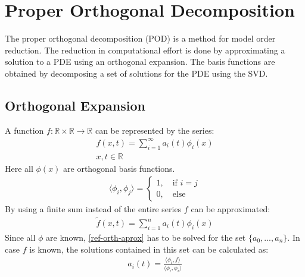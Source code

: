 \section{Proper Orthogonal Decomposition} \label{chap-pod}
The proper orthogonal decomposition (POD) is a method for model order reduction.
The reduction in computational effort is done by approximating a solution to a PDE using an orthogonal expansion.
The basis functions are obtained by decomposing a set of solutions for the PDE using the SVD.
\subsection{Orthogonal Expansion}
A function \(f: \mathbb{R} \times \mathbb{R} \rightarrow \mathbb{R}\) can be represented by the series:
\begin{gather}
f(x, t) = \sum_{i = 1}^{\infty}a_i(t)\phi_i(x) \\
x, t \in \mathbb{R} \label{ref-orth-exp}
\end{gather}
Here all \(\phi(x)\) are orthogonal basis functions.
\begin{gather}
\langle\phi_i, \phi_j\rangle =\begin{cases}
1, \quad \text{if } i = j \\
0, \quad \text{else}
\end{cases} \label{phi-orth}
\end{gather}
By using a finite sum instead of the entire  series \(f\) can be approximated:
\begin{gather}
\tilde{f}(x, t) = \sum_{i = 1}^{n}a_{i}(t)\phi_{i}(x) \label{ref-orth-aprox}
\end{gather}
Since all \(\phi\) are known, \ref{ref-orth-aprox} has to be solved for the set \(\{a_0, ..., a_n\}\).
In case \(f\) is known, the solutions contained in this set can be calculated as:
\begin{gather}
a_i(t) = \frac{\langle \phi_i, f \rangle}{\langle \phi_i, \phi_i \rangle} \label{sol-ai}
\end{gather}
\cite{Gustafsson2011e}
